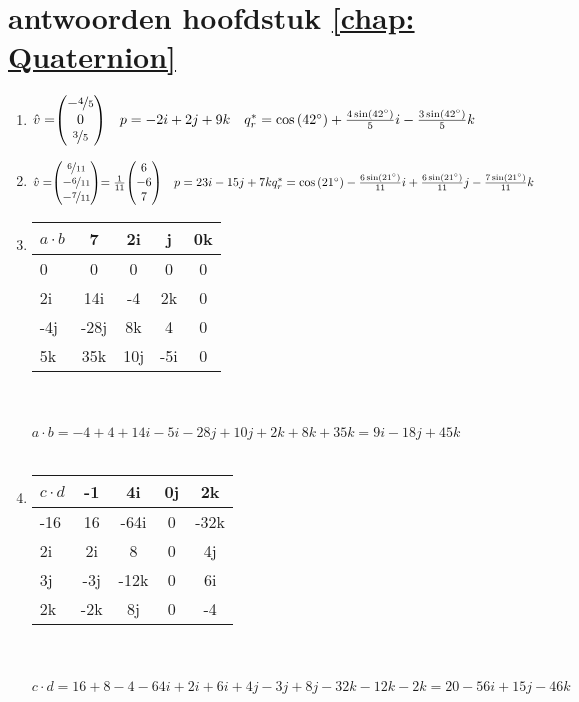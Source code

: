 \section{antwoorden  hoofdstuk \ref{chap: Quaternion}}
\begin{enumerate}
	\item 
	$\hat{v} = \vecdrie{-\nicefrac{4}{5}}{0}{\nicefrac{3}{5}}
	\quad p  = -2i +2j + 9k 
	\quad q^*_r  =  \cos\left(42 \degree\right)  + \frac{4 \sin\left(42 \degree\right)}{5}i -
	\frac{3 \sin\left(42 \degree\right)}{5}k$ \\
	
	\item 
	$\hat{v} = \vecdrie{\nicefrac{6}{11}}{-\nicefrac{6}{11}}{-\nicefrac{7}{11}} = \frac{1}{11}\vecdrie{6}{-6}{7}
	\quad p  = 23i - 15j + 7k \\
	q^*_r  =  \cos\left(21 \degree\right)  - \frac{6 \sin\left(21 \degree\right)}{11}i 
	+\frac{6 \sin\left(21 \degree\right)}{11}j
	-\frac{7 \sin\left(21 \degree\right)}{11}k$ \\
	
	\item
	\begin{tabular}{ | l || c | c |c |c |}
		\hline
		$ a\cdot b $ & 7 & 2i   & j & 0k \\ \hline \hline
		0    & 0 & 0   &   0        & 0  \\ \hline
		2i    & 14i & -4   &   2k        & 0  \\ \hline
		-4j   & -28j &  8k &   4     & 0\\ \hline
		5k    & 35k  & 10j   & -5i   & 0\\ 
		\hline 
	\end{tabular} \\ \\
	$ a\cdot b = -4 + 4 +14i -5i -28j +10j +2k + 8k + 35k =  9i -18j +45k $ \\ \\
	
	\item
	\begin{tabular}{ | l || c | c |c |c |}
		\hline
		$ c\cdot d $ & -1  & 4i   & 0j & 2k \\ \hline \hline
		      -16      & 16  & -64i & 0  & -32k  \\ \hline
		       2i     & 2i  & 8    & 0  & 4j  \\ \hline
		       3j     & -3j & -12k & 0  & 6i\\ \hline
		       2k     & -2k & 8j   & 0  & -4\\ 
		\hline 
	\end{tabular} \\ \\
	$ c\cdot d = 16 +8  -4  -64i +2i +6i  +4j -3j +8j -32k -12k -2k =  20-56i+15j -46k $ \\ \\
	

\end{enumerate}
